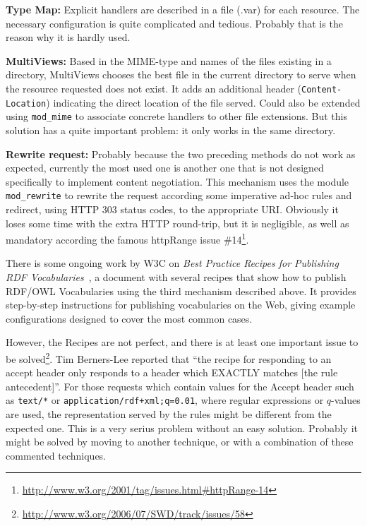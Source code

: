 \documentclass{../templates/llncs}
\begin{document}
\begin{description}

  \item \textbf{Type Map:} Explicit handlers are described in a file (.var) for 
        each resource. The necessary configuration is quite complicated and 
        tedious. Probably that is the reason why it is hardly used.

  \item \textbf{MultiViews:} Based in the MIME-type and names of the files 
        existing in a directory, MultiViews chooses the best file in the current 
        directory to serve when the resource requested does not exist. It adds 
        an additional header (\texttt{Content-Location}) indicating the direct 
        location of the file served. Could also be extended using \texttt{mod\_mime} 
        to associate concrete handlers to other file extensions. But this solution
        has a quite important problem: it only works in the same directory.

  \item \textbf{Rewrite request:} Probably because the two preceding methods 
        do not work as expected, currently the most used one is another one 
        that is not designed specifically to implement content negotiation. 
        This mechanism uses the module \texttt{mod\_rewrite} to rewrite the 
        request according some imperative ad-hoc rules and redirect, using 
        HTTP 303 status codes, to the appropriate URI. Obviously it loses 
        some time with the extra HTTP round-trip, but it is negligible,
        as well as mandatory according the famous httpRange issue
        \#14\footnote{\url{http://www.w3.org/2001/tag/issues.html#httpRange-14}}.

\end{description}

There is some ongoing work by W3C on \textit{Best Practice Recipes for Publishing 
RDF Vocabularies}~\cite{Recipes}, a document with several recipes that show how 
to publish RDF/OWL Vocabularies using the third mechanism described above. It 
provides step-by-step instructions for publishing vocabularies on the Web, giving 
example configurations designed to cover the most common cases.

However, the Recipes are not perfect, and there is at least one important issue to 
be solved\footnote{\url{http://www.w3.org/2006/07/SWD/track/issues/58}}.
Tim Berners-Lee reported that ``the recipe for responding to an accept 
header only responds to a header which EXACTLY matches [the rule antecedent]''.
For those requests which contain values for the Accept header such as 
\texttt{text/*} or \texttt{application/rdf+xml;q=0.01}, where regular
expressions or $q$-values are used, the representation served by the
rules might be different from the expected one. This is a very serius problem 
without an easy solution. Probably it might be solved by moving to another 
technique, or with a combination of these commented techniques.
\end{document}
